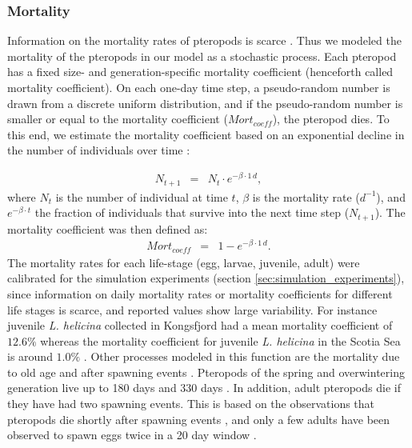 \subsubsection{Mortality}
Information on the mortality rates of pteropods is scarce \citep{Lischka2011WarmingAcidificationJuveniles,Bednarsek2012Population,Bednarsek2016CumulativeEffects}. Thus we modeled the mortality of the pteropods in our model as a stochastic process. Each pteropod has a fixed size- and generation-specific mortality coefficient (henceforth called mortality coefficient). On each one-day time step, a pseudo-random number is drawn from a discrete uniform distribution, and if the pseudo-random number is smaller or equal to the mortality coefficient ($Mort_{coeff}$), the pteropod dies. To this end, we estimate the mortality coefficient based on an exponential decline in the number of individuals over time \citep{Bednarsek2012Population,Bednarsek2016CumulativeEffects}:

{\scriptsize
\begin{eqnarray}
N_{t+1} & = & N_{t}\cdot e^{-\beta \cdot 1\, d},
\end{eqnarray}}
\noindent
where $N_{t}$ is the number of individual at time $t$, $\beta$ is the mortality rate ($d^{-1}$), and $e^{-\beta \cdot t}$ the fraction of individuals that survive into the next time step ($N_{t+1}$). The mortality coefficient was then defined as:
{\scriptsize
\begin{eqnarray}
Mort_{coeff} & = & 1 - e^{-\beta \cdot 1\, d}.
\end{eqnarray}}
\noindent
The mortality rates for each life-stage (egg, larvae, juvenile, adult) were calibrated for the simulation experiments (section \ref{sec:simulation_experiments}), since information on daily mortality rates \citep[$\beta$; ][]{Bednarsek2016CumulativeEffects}  or mortality coefficients \citep{Lischka2011WarmingAcidificationJuveniles} for different life stages is scarce, and reported values show large variability. For instance juvenile \textit{L. helicina} collected in Kongsfjord had a mean mortality coefficient of $12.6\%$ \citep{Lischka2011WarmingAcidificationJuveniles} whereas the mortality coefficient for juvenile \textit{L. helicina} in the Scotia Sea is around $1.0 \%$ \citep{Bednarsek2012Population,Bednarsek2016CumulativeEffects}. Other processes modeled in this function are the mortality due to old age \citep{Wang2017Lifecycle} and after spawning events \citep{Wang2017Lifecycle}. Pteropods of the spring and overwintering generation live up to 180 days \citep{Howes2014Lab,Thabet2015Lifestages,Wang2017Lifecycle} and 330 days \citep{Wang2017Lifecycle}. In addition, adult pteropods die if they have had two spawning events. This is based on the observations that pteropods die shortly after spawning events \citep{Dadon1992Reproduction,Gannefors2005Overwintering,Hunt2008TopPredators,Howes2014Lab}, and only a few adults have been observed to spawn eggs twice in a 20 day window \citep{Paranjape1968egg}.





